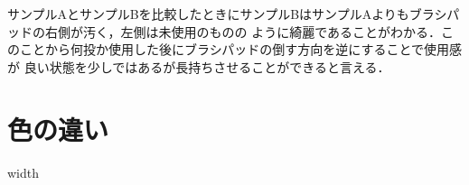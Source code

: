 \documentclass[main]{subfiles}
\begin{document}
サンプルAとサンプルBを比較したときにサンプルBはサンプルAよりもブラシパッドの右側が汚く，左側は未使用のものの
ように綺麗であることがわかる．このことから何投か使用した後にブラシパッドの倒す方向を逆にすることで使用感が
良い状態を少しではあるが長持ちさせることができると言える．
\\

\section{色の違い}
width
\end{document}
